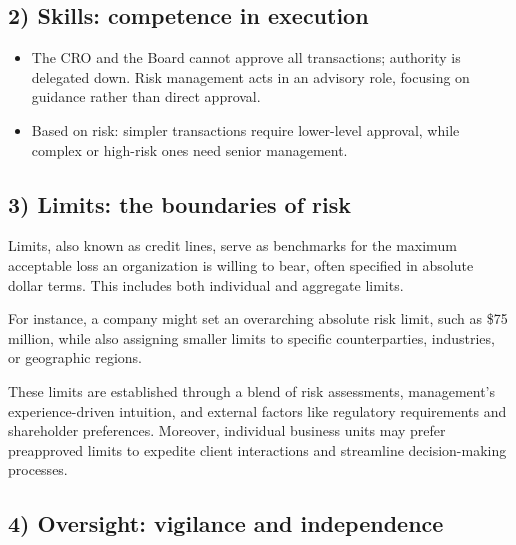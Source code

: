 \subsection*{2) Skills: competence in execution}

\begin{itemize}
\item {} The CRO and the Board cannot approve all transactions;
authority is delegated down. Risk management acts in an advisory role, focusing
on guidance rather than direct approval.
\item {} Based on risk: simpler transactions require
lower-level approval, while complex or high-risk ones need senior management.
\end{itemize}

\subsection*{3) Limits: the boundaries of risk}

Limits, also known as credit lines, serve as benchmarks for the maximum
acceptable loss an organization is willing to bear, often specified in absolute
dollar terms. This includes both individual and aggregate limits.

For instance, a company might set an overarching absolute risk limit, such as
\$75 million, while also assigning smaller limits to specific counterparties,
industries, or geographic regions.

These limits are established through a blend of risk assessments, management's
experience-driven intuition, and external factors like regulatory requirements
and shareholder preferences. Moreover, individual business units may prefer
preapproved limits to expedite client interactions and streamline decision-making
processes.

\subsection*{4) Oversight: vigilance and independence}

